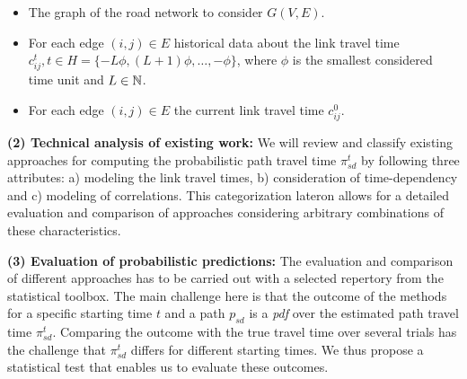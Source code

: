 \begin{itemize}
  \item The graph of the road network to consider $G(V,E)$.
  \item For each edge $(i,j) \in E$ historical data about the
  link travel time $c_{ij}^t, t \in H = \{-L\phi, (L+1)\phi, \ldots,
  -\phi\}$, where $\phi$ is the smallest considered time unit and $L \in \mathbb{N}$.
  \item For each edge $(i,j) \in E$ the current link travel time
  $c_{ij}^0$.
\end{itemize}


\textbf{(2) Technical analysis of existing work:} We will review and
classify existing approaches for computing the probabilistic
path travel time $\pi^t_{sd}$ by following three
attributes: a) modeling the link travel times, b) consideration of
time-dependency and c) modeling of correlations. This categorization lateron allows for a detailed evaluation and comparison of approaches considering arbitrary combinations of these characteristics.

\textbf{(3) Evaluation of probabilistic predictions:} The evaluation and
comparison of different approaches has to be carried out with a selected
repertory from the statistical toolbox. The main challenge here is that the
outcome of the methods for a specific starting time $t$ and a path  $p_{sd}$ is a \textit{pdf} over the estimated path travel time $\pi^t_{sd}$. Comparing the outcome with the true travel time over several
trials has the challenge that $\pi^t_{sd}$ differs for different starting times.
We thus propose a statistical test that enables us to evaluate these outcomes.



